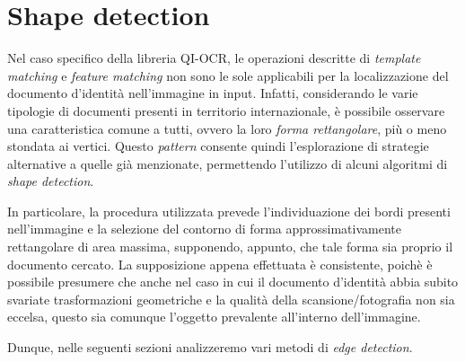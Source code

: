 \section{Shape detection}
Nel caso specifico della libreria QI-OCR, le operazioni descritte di \textit{template matching} e \textit{feature matching} non sono le sole applicabili per la localizzazione del documento d'identit\`a nell'immagine in input. Infatti, considerando le varie tipologie di documenti presenti in territorio internazionale, \`e possibile osservare una caratteristica comune a tutti, ovvero la loro \textit{forma rettangolare}, pi\`u o meno stondata ai vertici. Questo \textit{pattern} consente quindi l'esplorazione di strategie alternative a quelle gi\`a menzionate, permettendo l'utilizzo di alcuni algoritmi di \textit{shape detection}.\par
In particolare, la procedura utilizzata prevede l'individuazione dei bordi presenti nell'immagine e la selezione del contorno di forma approssimativamente rettangolare di area massima, supponendo, appunto, che tale forma sia proprio il documento cercato. La supposizione appena effettuata \`e consistente, poich\`e \`e possibile presumere che anche nel caso in cui il documento d'identit\`a abbia subito svariate trasformazioni geometriche e la qualit\`a della scansione/fotografia non sia eccelsa, questo sia comunque l'oggetto prevalente all'interno dell'immagine.\par
Dunque, nelle seguenti sezioni analizzeremo vari metodi di \textit{edge detection}.

